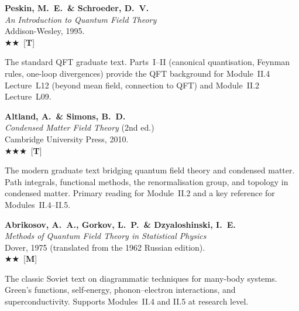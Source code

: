 \documentclass[11pt,a4paper]{article}
\newcommand{\essential}{$\bigstar\bigstar\bigstar$}
\newcommand{\recommended}{$\bigstar\bigstar$}
\newenvironment{bibentry}[1]{\begin{tcolorbox}[entrybox=#1,top=4pt,bottom=4pt]}{\end{tcolorbox}\smallskip}
\begin{document}
\begin{bibentry}{t5light}
\textbf{Peskin, M.~E.\ \& Schroeder, D.~V.}\\
\textit{An Introduction to Quantum Field Theory}\\
Addison-Wesley, 1995.\\[3pt]
\recommended\ [\textbf{T}]\\[3pt]
\begin{tcolorbox}[annotbox]
The standard QFT graduate text. Parts~I--II (canonical quantisation, Feynman rules,
one-loop divergences) provide the QFT background for Module~II.4 Lecture~L12
(beyond mean field, connection to QFT) and Module~II.2 Lecture~L09.
\end{tcolorbox}
\end{bibentry}

\begin{bibentry}{t5light}
\textbf{Altland, A.\ \& Simons, B.~D.}\\
\textit{Condensed Matter Field Theory} (2nd ed.)\\
Cambridge University Press, 2010.\\[3pt]
\essential\ [\textbf{T}]\\[3pt]
\begin{tcolorbox}[annotbox]
The modern graduate text bridging quantum field theory and condensed matter. Path
integrals, functional methods, the renormalisation group, and topology in condensed
matter. Primary reading for Module~II.2 and a key reference for Modules~II.4--II.5.
\end{tcolorbox}
\end{bibentry}

\begin{bibentry}{t5light}
\textbf{Abrikosov, A.~A., Gorkov, L.~P.\ \& Dzyaloshinski, I.~E.}\\
\textit{Methods of Quantum Field Theory in Statistical Physics}\\
Dover, 1975 (translated from the 1962 Russian edition).\\[3pt]
\recommended\ [\textbf{M}]\\[3pt]
\begin{tcolorbox}[annotbox]
The classic Soviet text on diagrammatic techniques for many-body systems. Green's
functions, self-energy, phonon--electron interactions, and superconductivity.
Supports Modules~II.4 and II.5 at research level.
\end{tcolorbox}
\end{bibentry}

\end{document}
